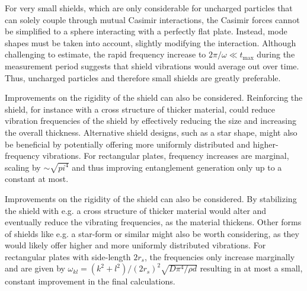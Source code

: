For very small shields, which are only considerable for uncharged particles that can solely couple through mutual Casimir interactions, the Casimir forces cannot be simplified to a sphere interacting with a perfectly flat plate.
Instead, mode shapes must be taken into account, slightly modifying the interaction.
Although challenging to estimate, the rapid frequency increase to $2\pi/\omega \ll t_\mathrm{max}$ during the measurement period suggests that shield vibrations would average out over time.
Thus, uncharged particles and therefore small shields are greatly preferable.

Improvements on the rigidity of the shield can also be considered. 
Reinforcing the shield, for instance with a cross structure of thicker material, could reduce vibration frequencies of the shield by effectively reducing the size and increasing the overall thickness.
Alternative shield designs, such as a star shape, might also be beneficial by potentially offering more uniformly distributed and higher-frequency vibrations. For rectangular plates, frequency increases are marginal, scaling by $\sim \sqrt{pi^4}$ \cite[p. 471-474]{Rao_2019} and thus improving entanglement generation only up to a constant at most.

Improvements on the rigidity of the shield can also be considered. By stabilizing the shield with e.g. a cross structure of thicker material would alter and eventually reduce the vibrating frequencies, as the material thickens.
Other forms of shields like e.g. a star-form or similar might also be worth considering, as they would likely offer higher and more uniformly distributed vibrations.
For rectangular plates with side-length $2 r_s$, the frequencies only increase marginally and are given by $\omega_{kl} = (k^2 + l^2)/(2r_s)^2 \sqrt{D \pi^4 / \rho d}$ \cite[p. 471-474]{Rao_2019} resulting in at most a small, constant improvement in the final calculations.